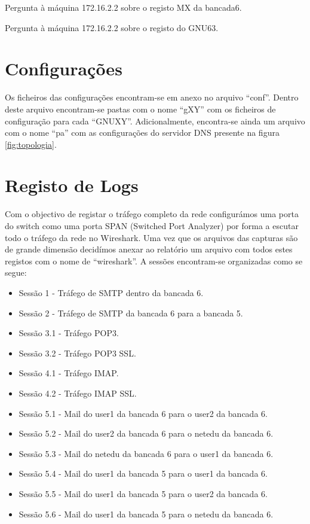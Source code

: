 \documentclass[a4paper,12pt]{article}
\begin{document}
\begin{program}
	
  \caption{Pergunta à máquina 172.16.2.2 sobre o registo MX da bancada6.}
	\label{log:172mx}
\end{program}

\begin{program}
	
  \caption{Pergunta à máquina 172.16.2.2 sobre o registo do GNU63.}
	\label{log:172a}
\end{program}


\section{Configurações}

Os ficheiros das configurações encontram-se em anexo no arquivo ``conf''.
Dentro deste arquivo encontram-se pastas com o nome ``gXY'' com os ficheiros
de configuração para cada ``GNUXY''. Adicionalmente, encontra-se ainda um
arquivo com o nome ``pa'' com as configurações do servidor DNS presente na 
figura \ref{fig:topologia}.

\section{Registo de Logs}

Com o objectivo de registar o tráfego completo da rede configurámos uma porta
do switch como uma porta SPAN (Switched Port Analyzer) por forma a escutar todo
o tráfego da rede no Wireshark.
Uma vez que os arquivos das capturas são de grande dimensão decidímos anexar 
ao relatório um arquivo com todos estes registos com o nome de ``wireshark''. 
A sessões encontram-se organizadas como se segue:

\begin{itemize}
	\item Sessão 1 - Tráfego de SMTP dentro da bancada 6.
	\item Sessão 2 - Tráfego de SMTP da bancada 6 para a bancada 5.
	\item Sessão 3.1 - Tráfego POP3.
	\item Sessão 3.2 - Tráfego POP3 SSL.
	\item Sessão 4.1 - Tráfego IMAP.
	\item Sessão 4.2 - Tráfego IMAP SSL.
	\item Sessão 5.1 - Mail do user1 da bancada 6 para o user2 da bancada 6.
	\item Sessão 5.2 - Mail do user2 da bancada 6 para o netedu da bancada 6.
	\item Sessão 5.3 - Mail do netedu da bancada 6 para o user1 da bancada 6.
	\item Sessão 5.4 - Mail do user1 da bancada 5 para o user1 da bancada 6.
	\item Sessão 5.5 - Mail do user1 da bancada 5 para o user2 da bancada 6.
	\item Sessão 5.6 - Mail do user1 da bancada 5 para o netedu da bancada 6.
\end{itemize}
\end{document}
